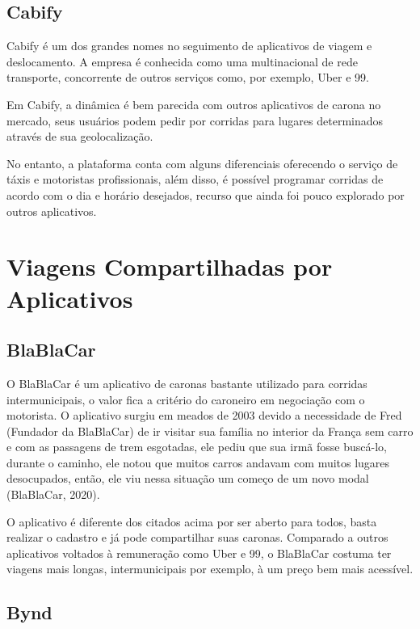 \subsection{Cabify}

Cabify é um dos grandes nomes no seguimento de aplicativos de viagem e deslocamento. A empresa é conhecida como uma multinacional de rede transporte, concorrente de outros serviços como, por exemplo, Uber e 99.

Em Cabify, a dinâmica é bem parecida com outros aplicativos de carona no mercado, seus usuários podem pedir por corridas para lugares determinados através de sua geolocalização.

No entanto, a plataforma conta com alguns diferenciais oferecendo o serviço de táxis e motoristas profissionais, além disso, é possível programar corridas de acordo com o dia e horário desejados, recurso que ainda foi pouco explorado por outros aplicativos. 


\section{Viagens Compartilhadas por Aplicativos}
\subsection{BlaBlaCar}

O BlaBlaCar é um aplicativo de caronas bastante utilizado para corridas intermunicipais, o valor fica a critério do caroneiro em negociação com o motorista. O aplicativo surgiu em meados de 2003 devido a necessidade de Fred (Fundador da BlaBlaCar) de ir visitar sua família no interior da França sem carro e com as passagens de trem esgotadas, ele pediu que sua irmã fosse buscá-lo, durante o caminho, ele notou que muitos carros andavam com muitos lugares desocupados, então, ele viu nessa situação um começo de um novo modal (BlaBlaCar, 2020).

O aplicativo é diferente dos citados acima por ser aberto para todos, basta realizar o cadastro e já pode compartilhar suas caronas. Comparado a outros aplicativos voltados à remuneração como Uber e 99, o BlaBlaCar costuma ter viagens mais longas, intermunicipais por exemplo, à um preço bem mais acessível. %

\subsection{Bynd}

